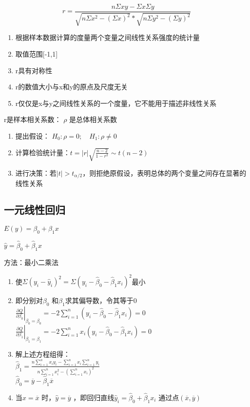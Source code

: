 \documentclass[UTF8,10pt]{book}
\begin{document}
{\[r = \frac{n \Sigma xy -\Sigma x \Sigma y }{\sqrt{n \Sigma x^2 - \left( \Sigma x \right)^2}  * \sqrt{n \Sigma y^2 - \left( \Sigma y \right)^2}  }\]

\begin{enumerate}
	\def\labelenumi{\arabic{enumi}.}
	\item
	根据样本数据计算的度量两个变量之间线性关系强度的统计量
	\item
	取值范围{[}-1,1{]}
	\item
	r具有对称性
	\item
	r的数值大小与x和y的原点及尺度无关
	\item
	r仅仅是x与y之间线性关系的一个度量，它不能用于描述非线性关系
\end{enumerate}

r是样本相关系数： \(\rho\) 是总体相关系数

\begin{enumerate}
	\def\labelenumi{\arabic{enumi}.}
	\item
	提出假设： \( H_0:\rho=0; \quad H_1:\rho\neq 0 \)
	\item
	计算检验统计量：\( t = |r| \sqrt{  \frac{n-2}{1-r^2}   }   \sim t(n-2) \)
	\item
	进行决策：若\(|t|>t_{\alpha / 2}\)，则拒绝原假设，表明总体的两个变量之间存在显著的线性关系
\end{enumerate}

\subsection{一元线性回归}\label{header-n79}

\( E(y) = \beta_0 + \beta_1 x  \)

\( \hat{y} = \hat{\beta}_0 + \hat{\beta}_1 x \)

方法：最小二乘法

\begin{enumerate}
	\def\labelenumi{\arabic{enumi}.}
	\item
	使\(\Sigma(y_i - \hat{y}_i)^2 = \Sigma(y_i - \hat{\beta}_0 - \hat{\beta}_1 x_i)^2\)最小
	\item
	即分别对\(\beta_{0}\) 和\(\beta_{1}\)求其偏导数，令其等于0\\
	\( \left.   \frac{\partial Q}{\partial \beta_0}\right|_{\beta_0 = \hat{\beta}_0}  = -2 \sum_{i=1}^n (y_i - \hat{\beta}_0 - \hat{\beta}_1 x_i) = 0   \)\\
	\( \left.   \frac{\partial Q}{\partial \beta_1}\right|_{\beta_1 = \hat{\beta}_1}  = -2 \sum_{i=1}^n x_i(y_i - \hat{\beta}_0 - \hat{\beta}_1 x_i) = 0   \)
	\item
	解上述方程组得：\\
	\( \hat{\beta}_1 = \frac{n \sum_{i=1}^n x_i y_i - \sum_{i=1}^n x_i \sum_{i=1}^n y_i}{n \sum_{i=1}^n x_i^2 - \left(\sum_{i=1}^n x_i\right)^2}    \)
	\\
	\(\hat{\beta}_{0} = \overline{y} - \hat{\beta}_1 \overline{x}\)
	\item
	当\(x=\overline{x}\) 时，\(\hat{y}=\overline{y}\)
	，即回归直线\(\hat{y}_i=\hat{\beta}_0+\hat{\beta}_1 x_i\)
	通过点\((\overline{x},\overline{y})\)
\end{enumerate}

}
\end{document}
